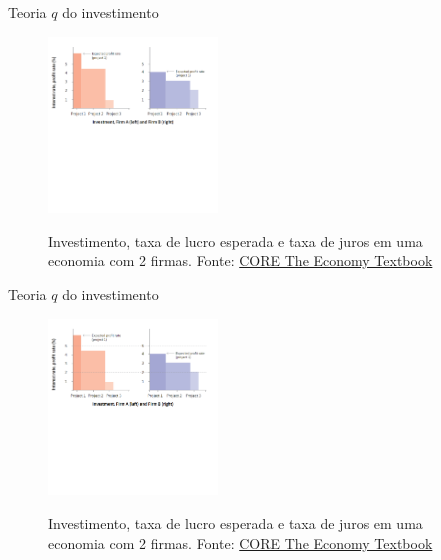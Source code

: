 \documentclass[10pt]{beamer}
\begin{document}
\begin{frame}
    {Teoria $q$ do investimento}
    \begin{figure}
        \centering
        \href{https://core-econ.org/the-economy/book/text/14.html\#144-investment-spending}{\includegraphics[width=0.4\textwidth]{./figures/aula8_fig3.PNG}}
        \caption{Investimento, taxa de lucro esperada e taxa de juros em uma economia com 2 firmas. Fonte: \href{https://core-econ.org/the-economy/book/text/14.html\#144-investment-spending}{CORE The Economy Textbook}}
    \end{figure}
\end{frame}

\begin{frame}
    {Teoria $q$ do investimento}
    \begin{figure}
        \centering
        \href{https://core-econ.org/the-economy/book/text/14.html\#144-investment-spending}{\includegraphics[width=0.4\textwidth]{./figures/aula8_fig4.PNG}}
        \caption{Investimento, taxa de lucro esperada e taxa de juros em uma economia com 2 firmas. Fonte: \href{https://core-econ.org/the-economy/book/text/14.html\#144-investment-spending}{CORE The Economy Textbook}}
    \end{figure}
\end{frame}
\end{document}
